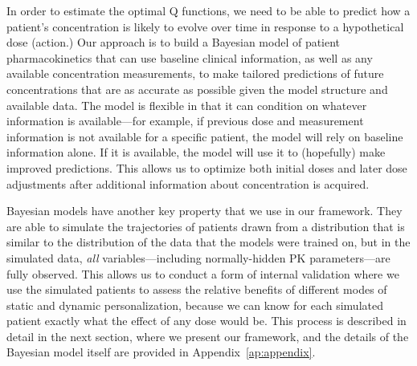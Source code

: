 In order to estimate the optimal Q functions, we need to be able to predict how a patient's concentration is likely to evolve over time in response to a hypothetical dose (action.)  Our approach is to build a Bayesian model of patient pharmacokinetics that can use baseline clinical information, as well as any available concentration measurements, to make tailored predictions of future concentrations that are as accurate as possible given the model structure and available data. The model is flexible in that it can condition on whatever information is available---for example, if previous dose and measurement information is not available for a specific patient, the model will rely on baseline information alone. If it is available, the model will use it to (hopefully) make improved predictions. This allows us to optimize both initial doses and later dose adjustments after additional information about concentration is acquired.

Bayesian models have another key property that we use in our framework. They are able to simulate the trajectories of patients drawn from a distribution that is similar to the distribution of the data that the models were trained on, but in the simulated data, \textit{all} variables---including normally-hidden PK parameters---are fully observed. This allows us to conduct a form of internal validation where we use the simulated patients to assess the relative benefits of different modes of static and dynamic personalization, because we can know for each simulated patient exactly what the effect of any dose would be. This process is described in detail in the next section, where we present our framework, and the details of the Bayesian model itself are provided in Appendix~\ref{ap:appendix}.
